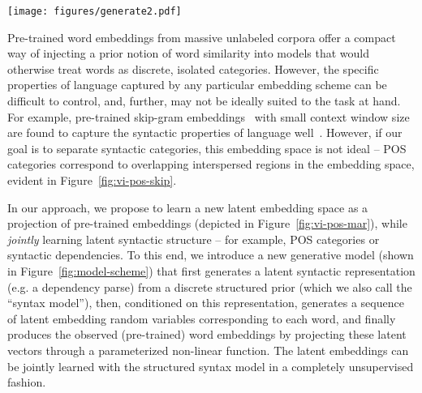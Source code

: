 \documentclass[11pt,a4paper]{article}
\begin{document}
\begin{figure*}[!t]
   \centering
    \texttt{[image: figures/generate2.pdf]}
    \vspace{-1.5mm}
    \caption{Depiction of proposed generative model. The syntax model is composed of discrete random variables, $z_i$. Each $\bm{e}_i$ is a latent continuous embeddings sampled from Gaussian distribution conditioned on $z_i$, while $\bm{x}_i$ is the observed embedding, deterministically derived from $\bm{e}_i$. The left portion depicts how the neural projector maps the simple Gaussian  to a more complex distribution in the output space. The right portion depicts two instantiations of the syntax model in our approach: one is Markov-structured and the other is DMV-structured. For DMV, $z_{\text{tree}}$ is the latent dependency tree structure.}
    \label{fig:model-scheme}
  \vspace{-5mm}
\end{figure*}
Pre-trained word embeddings from massive unlabeled corpora offer a compact way of injecting a prior notion of word similarity into models that would otherwise treat words as discrete, isolated categories. 
However, the specific properties of language captured by any particular embedding scheme can be difficult to control, and, further, may not be ideally suited to the task at hand. For example, pre-trained skip-gram embeddings~\citep{mikolov2013efficient} with small context window size are found to capture the syntactic properties of language well~\citep{bansal2014tailoring, lin2015unsupervised}. However, if our goal is to separate syntactic categories, this embedding space is not ideal -- POS categories correspond to overlapping interspersed regions in the embedding space, evident in Figure~\ref{fig:vi-pos-skip}.


In our approach, we propose to learn a new latent embedding space as a projection of pre-trained embeddings (depicted in Figure~\ref{fig:vi-pos-mar}), while \emph{jointly} learning latent syntactic structure -- for example, POS categories or syntactic dependencies.
To this end, we introduce 
a new generative model  (shown in Figure~\ref{fig:model-scheme}) that first generates a latent syntactic representation (e.g. a dependency parse) from a discrete structured prior (which we also call the ``syntax model''),
then, conditioned on this representation, generates a sequence of latent embedding random variables corresponding to each word, and finally produces the observed (pre-trained) word embeddings by projecting these latent vectors through a parameterized non-linear function.
 The latent embeddings can be jointly learned with the structured syntax model in a completely unsupervised fashion. 
\end{document}
